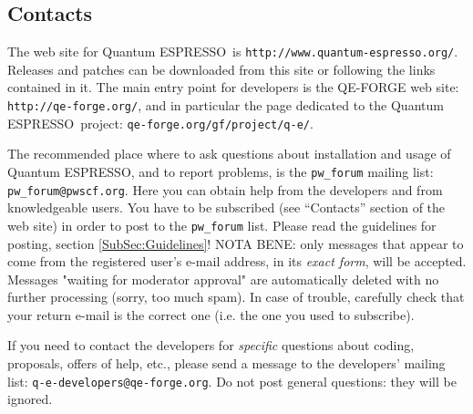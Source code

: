 \documentclass[12pt,a4paper]{article}
\def\qe{{\sc Quantum ESPRESSO}}
\begin{document}
\subsection{Contacts}
\label{SubSec:Contacts}

The web site for \qe\ is \texttt{http://www.quantum-espresso.org/}.
Releases and patches can be downloaded from this
site or following the links contained in it. The main entry point for
developers is the QE-FORGE web site:
\texttt{http://qe-forge.org/}, and in particular the page dedicated to
the \qe\ project: \texttt{qe-forge.org/gf/project/q-e/}.

The recommended place where to ask questions about installation
and usage of \qe, and to report problems, is the \texttt{pw\_forum}
mailing list: \texttt{pw\_forum@pwscf.org}.
Here you can obtain help from the developers and from
knowledgeable users. You have to be subscribed (see ``Contacts''
section of the web site) in order to post to the  \texttt{pw\_forum}
list. Please read the guidelines for posting, section \ref{SubSec:Guidelines}!
NOTA BENE: only messages that appear to come from the
registered user's e-mail address, in its {\em exact form}, will be
accepted. Messages "waiting for moderator approval" are
automatically deleted with no further processing (sorry, too
much spam). In case of trouble, carefully check that your return
e-mail is the correct one (i.e. the one you used to subscribe).

If you need to contact the developers for {\em specific} questions
about coding, proposals, offers of help, etc., please send a message
to the developers' mailing list: \texttt{q-e-developers@qe-forge.org}.
Do not post general questions: they will be ignored.
\end{document}
